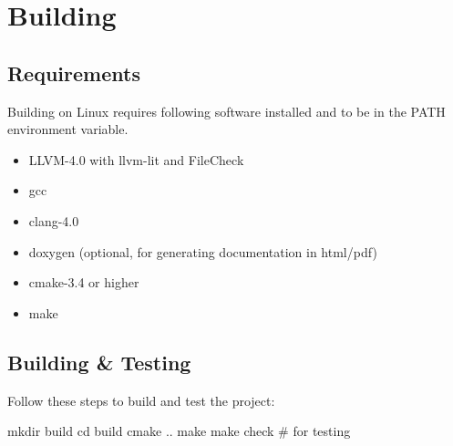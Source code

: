 \section{Building}

\subsection{Requirements}

Building on Linux requires following software installed and to be in the PATH
environment variable.

\begin{itemize}
    \item LLVM-4.0 with llvm-lit and FileCheck
    \item gcc
    \item clang-4.0
    \item doxygen (optional, for generating documentation in html/pdf)
    \item cmake-3.4 or higher
    \item make
\end{itemize}

\subsection{Building \& Testing}

Follow these steps to build and test the project:

    mkdir build
    cd build
    cmake ..
    make
    make check \# for testing
